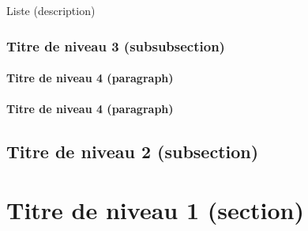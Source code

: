 \medskip
Liste (description)
\blinddescription

		\subsubsection{Titre de niveau 3 (subsubsection)}
\paragraph{Titre de niveau 4 (paragraph)} \blindtext

\paragraph{Titre de niveau 4 (paragraph)} \blindtext

	\subsection{Titre de niveau 2 (subsection)}
\blindtext


\section{Titre de niveau 1 (section)}
\blindtext


\clearpage
\thispagestyle{empty}